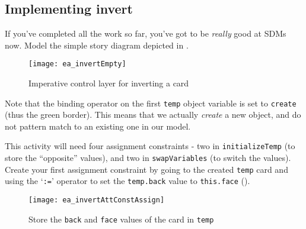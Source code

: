 \newpage
\hypertarget{invertCard vis}{}
\subsection{Implementing invert}
\genHeader

\begin{stepbystep}

\vspace{0.5cm}

\item If you've completed all the work so far, you've got to be \emph{really} good at SDMs now. Model the simple story diagram
depicted in .

\vspace{0.5cm}

\begin{figure}[htbp]
\begin{center}
  \texttt{[image: ea\_invertEmpty]}
  \caption{Imperative control layer for inverting a card}  
  \label{ea:sdm_invertEmpty}
\end{center}
\end{figure}

\item Note that the binding operator on the first \texttt{temp} object variable is set to \texttt{create} (thus the green
border). This means that we actually \emph{create} a new object, and do not pattern match to an existing one in our model.

\item This activity will need four assignment constraints - two in \texttt{in\-it\-ia\-lize\-Temp} (to store the ``opposite'' values),
and two in \texttt{swapVariables} (to switch the values). Create your first assignment constraint by going to the created \texttt{temp} card and using the
`\texttt{:=}' operator to set the \texttt{temp.back} value to \texttt{this.face} ().

\begin{figure}[htbp]
\begin{center}
  \texttt{[image: ea\_invertAttConstAssign]}
  \caption{Store the \texttt{back} and \texttt{face} values of the card in \texttt{temp}}  
  \label{ea:sdm_invertAssignment}
\end{center}
\end{figure}

\clearpage

\vspace*{0.5cm}


\end{stepbystep}
